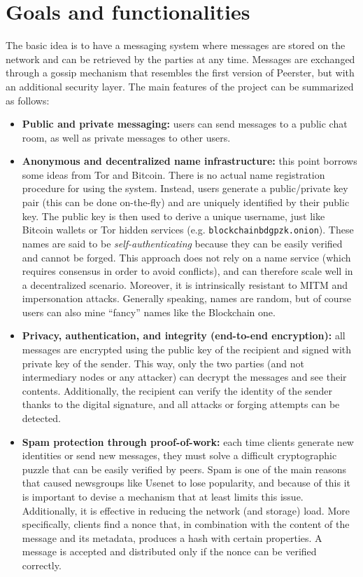 \documentclass[a4paper,12pt]{article}
\begin{document}
\section{Goals and functionalities} %
The basic idea is to have a messaging system where messages are stored on the network and can be retrieved by the parties at any time. Messages are exchanged through a gossip mechanism that resembles the first version of Peerster, but with an additional security layer. The main features of the project can be summarized as follows:
\begin{itemize}
	\item \textbf{Public and private messaging:} users can send messages to a public chat room, as well as private messages to other users.
	\item \textbf{Anonymous and decentralized name infrastructure:} this point borrows some ideas from Tor and Bitcoin. There is no actual name registration procedure for using the system. Instead, users generate a public/private key pair (this can be done on-the-fly) and are uniquely identified by their public key. The public key is then used to derive a unique username, just like Bitcoin wallets or Tor hidden services (e.g. \texttt{blockchainbdgpzk.onion}). These names are said to be \emph{self-authenticating} because they can be easily verified and cannot be forged. This approach does not rely on a name service (which requires consensus in order to avoid conflicts), and can therefore scale well in a decentralized scenario. Moreover, it is intrinsically resistant to MITM and impersonation attacks. Generally speaking, names are random, but of course users can also mine ``fancy'' names like the Blockchain one.
	\item \textbf{Privacy, authentication, and integrity (end-to-end encryption):} all messages are encrypted using the public key of the recipient and signed with private key of the sender. This way, only the two parties (and not intermediary nodes or any attacker) can decrypt the messages and see their contents. Additionally, the recipient can verify the identity of the sender thanks to the digital signature, and all attacks or forging attempts can be detected.
	\item \textbf{Spam protection through proof-of-work:} each time clients generate new identities or send new messages, they must solve a difficult cryptographic puzzle that can be easily verified by peers. Spam is one of the main reasons that caused newsgroups like Usenet to lose popularity, and because of this it is important to devise a mechanism that at least limits this issue. Additionally, it is effective in reducing the network (and storage) load. More specifically, clients find a nonce that, in combination with the content of the message and its metadata, produces a hash with certain properties. A message is accepted and distributed only if the nonce can be verified correctly.

\end{itemize}
\end{document}

